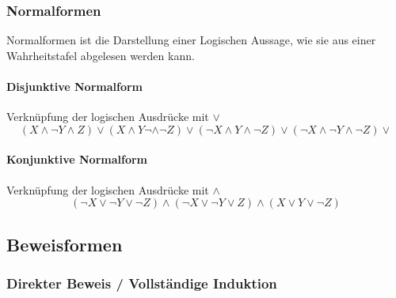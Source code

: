 \begin{multicols}{2}
\begin{description}
	\end{description}


\subsubsection{Normalformen}
	Normalformen ist die Darstellung einer Logischen Aussage, wie sie aus einer Wahrheitstafel abgelesen werden kann.
	
	\paragraph{Disjunktive Normalform}
		
		Verknüpfung der logischen Ausdrücke mit $\lor$
		\[
			(X \land \neg Y \land Z) \lor
			(X \land Y \neg \land \neg Z) \lor
			(\neg X \land Y \land \neg Z) \lor
			(\neg X \land \neg Y \land \neg Z) \lor 
		\]
	
	\paragraph{Konjunktive Normalform}
		
		Verknüpfung der logischen Ausdrücke mit $\land$
		\[
			(\neg X \lor \neg Y \lor \neg Z) \land
			(\neg X \lor \neg Y \lor Z) \land
			(X \lor Y \lor \neg Z)
		\]
		
		

\subsection{Beweisformen}

\subsubsection{Direkter Beweis / Vollständige Induktion }

\end{multicols}


